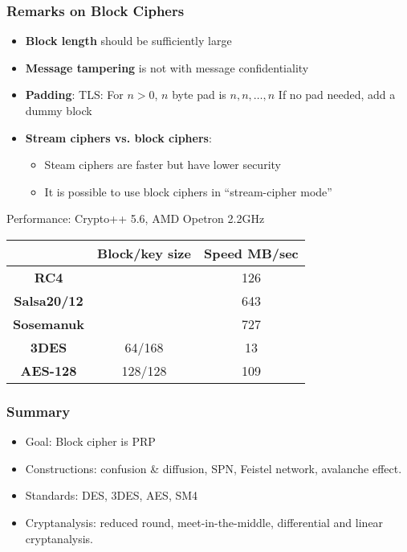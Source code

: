 \begin{frame}\frametitle{Remarks on Block Ciphers}
\begin{itemize}
\item \textbf{Block length} should be sufficiently large
\item \textbf{Message tampering} is not with message confidentiality
\item \textbf{Padding}: TLS: For $n>0$, $n$ byte pad is $n,n,\dots,n$
If no pad needed, add a dummy block
\item \textbf{Stream ciphers vs. block ciphers}: 
\begin{itemize}
\item Steam ciphers are faster but have lower security
\item It is possible to use block ciphers in ``stream-cipher mode''
\end{itemize}
\end{itemize}
\begin{exampleblock}{Performance: Crypto++ 5.6, AMD Opetron 2.2GHz}
\begin{center}
\begin{tabular}{|c|c|c|} \hline
                      & \textbf{Block/key size} & \textbf{Speed MB/sec} \\ \hline
\textbf{RC4}          &         & 126 \\  
\textbf{Salsa20/12}   &         & 643 \\ 
\textbf{Sosemanuk}    &         & 727 \\ 
\textbf{3DES}	      & 64/168  & 13  \\
\textbf{AES-128}      & 128/128 & 109 \\ \hline 
\end{tabular}	
\end{center}
\end{exampleblock}
\end{frame}
\begin{frame}\frametitle{Summary}
\begin{itemize}
\item Goal: Block cipher is PRP
\item Constructions: confusion \& diffusion, SPN, Feistel network, avalanche effect.
\item Standards: DES, 3DES, AES, SM4
\item Cryptanalysis: reduced round, meet-in-the-middle, differential and linear cryptanalysis. 
\end{itemize}
\end{frame}


